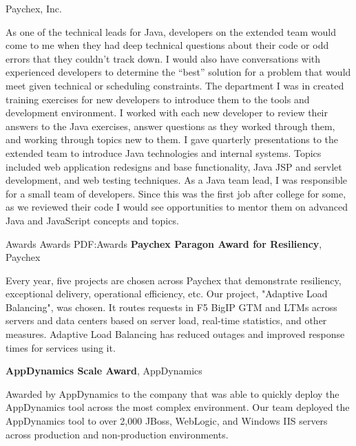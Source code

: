 \documentclass[letterpaper,MMMMyyyy,nonstopmode]{simpleresumecv}
\begin{document}
\begin{Body}
Paychex, Inc.
\begin{Detail}
\BulletItem
As one of the technical leads for Java, developers on the extended team would come to me when they had deep technical questions about their code or odd errors that they couldn't track down. I would also have conversations with experienced developers to determine the ``best'' solution for a problem that would meet given technical or scheduling constraints.
\BulletItem
The department I was in created training exercises for new developers to introduce them to the tools and development environment. I worked with each new developer to review their answers to the Java exercises,  answer questions as they worked through them, and working through topics new to them.
\BulletItem
I gave quarterly presentations to the extended team to introduce Java technologies and internal systems. Topics included web application redesigns and base functionality, Java JSP and servlet development, and web testing techniques.
\BulletItem
As a Java team lead, I was responsible for a small team of developers. Since this was the first job after college for some, as we reviewed their code I would see opportunities to mentor them on advanced Java and JavaScript concepts and topics.
\end{Detail}
\fi      %

\fi %


\Section
{Awards}
{Awards}
{PDF:Awards}
\textbf{Paychex Paragon Award for Resiliency}, Paychex
\hfill
{}
\begin{Detail}
Every year, five projects are chosen across Paychex that demonstrate resiliency, exceptional delivery, operational efficiency, etc.
Our project, "Adaptive Load Balancing", was chosen. It routes requests in F5 BigIP GTM and LTMs across servers and data centers based on server load, real-time statistics, and other measures. Adaptive Load Balancing has reduced outages and improved response times for services using it.
\end{Detail}
\BigGap

\textbf{AppDynamics Scale Award}, AppDynamics
\hfill
{}
\begin{Detail}
Awarded by AppDynamics to the company that was able to quickly deploy the AppDynamics tool across the most complex environment. Our team deployed the AppDynamics tool to over 2,000 JBoss, WebLogic, and Windows IIS servers across production and non-production environments.
\end{Detail}


\end{Body}
\end{document}
